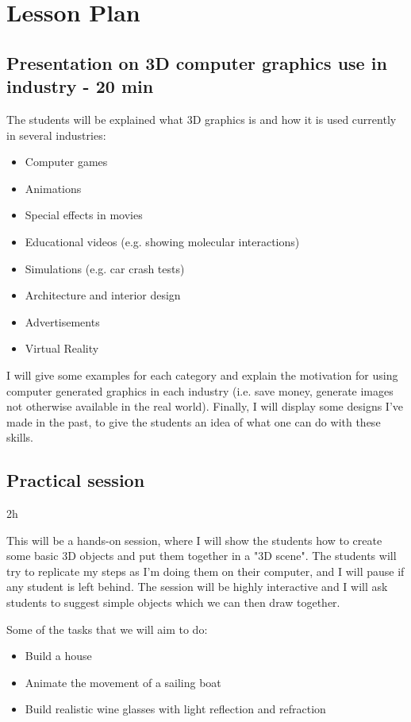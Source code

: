 \documentclass[11pt,a4paper]{report}
\begin{document}
\section*{Lesson Plan}

\subsection*{Presentation on 3D computer graphics use in industry - 20 min}

The students will be explained what 3D graphics is and how it is used currently in several industries:
\begin{itemize}
 \item Computer games
 \item Animations 
 \item Special effects in movies
 \item Educational videos (e.g. showing molecular interactions)
 \item Simulations (e.g. car crash tests)
 \item Architecture and interior design
 \item Advertisements
 \item Virtual Reality
\end{itemize}

I will give some examples for each category and explain the motivation for using computer generated graphics in each industry (i.e. save money, generate images not otherwise available in the real world). Finally, I will display some designs I've made in the past, to give the students an idea of what one can do with these skills.

\subsection*{Practical session} 2h

This will be a hands-on session, where I will show the students how to create some basic 3D objects and put them together in a "3D scene". The students will try to replicate my steps as I'm doing them on their computer, and I will pause if any student is left behind. The session will be highly interactive and I will ask students to suggest simple objects which we can then draw together.

Some of the tasks that we will aim to do:
\begin{itemize}
 \item Build a house
 \item Animate the movement of a sailing boat
 \item Build realistic wine glasses with light reflection and refraction
\end{itemize}
\end{document}
